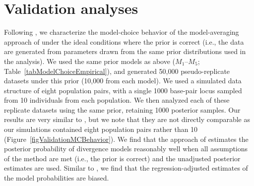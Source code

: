 \section*{Validation analyses}
Following \citet{Oaks2012}, we characterize the model-choice behavior of the
model-averaging approach of \citet{Hickerson2013} under the ideal conditions
where the prior is correct (i.e., the data are generated from parameters drawn
from the same prior distributions used in the analysis).
We used the same prior models as above ($M_1$--$M_5$;
Table~\ref{tabModelChoiceEmpirical}), and generated 50,000 pseudo-replicate
datasets under this prior (10,000 from each model).
We used a simulated data structure of eight population pairs, with a single
1000 base-pair locus sampled from 10 individuals from each population.
We then analyzed each of these replicate datasets using the same prior,
retaining 1000 posterior samples.
Our results are very similar to \citet{Oaks2012}, but we note that they
are not directly comparable as our simulations contained eight population
pairs rather than 10 (Figure~\ref{figValidationMCBehavior}).
We find that the approach of \citet{Hickerson2013} estimates the posterior
probability of divergence models reasonably well when all assumptions of the
method are met (i.e., the prior is correct) and the unadjusted posterior
estimates are used.
Similar to \cite{Oaks2012}, we find that the regression-adjusted estimates of
the model probabilities are biased.


